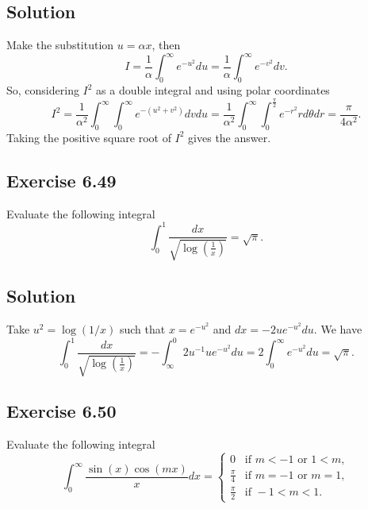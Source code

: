 \subsection*{Solution}

Make the substitution $u = \alpha x$, then
\begin{equation*}
    I = \frac{1}{\alpha} \int_0^{\infty} e^{-u^2} du
        = \frac{1}{\alpha} \int_0^{\infty} e^{-v^2} dv.
\end{equation*}
So, considering $I^2$ as a double integral and using polar coordinates
\begin{equation*}
    I^2 = \frac{1}{\alpha^2} \int_0^{\infty} \int_0^{\infty} e^{-(u^2 + v^2)} dv du
        = \frac{1}{\alpha^2} \int_0^{\infty} \int_0^{\frac{\pi}{2}} e^{-r^2} r d\theta dr
        = \frac{\pi}{4 \alpha^2}.
\end{equation*}
Taking the positive square root of $I^2$ gives the answer.


\subsection*{Exercise 6.49}

Evaluate the following integral
\begin{equation*}
    \int_0^1 \frac{dx}{\sqrt{\log\left(\frac{1}{x}\right)}} = \sqrt{\pi}.
\end{equation*}

\subsection*{Solution}

Take $u^2 = \log(1/x)$ such that $x = e^{-u^2}$ and $dx = -2ue^{-u^2}du$.
We have
\begin{equation*}
    \int_0^1 \frac{dx}{\sqrt{\log\left(\frac{1}{x}\right)}}
        = - \int_{\infty}^0 2 u^{-1} u e^{-u^2} du
        = 2 \int_0^{\infty} e^{-u^2} du
        = \sqrt{\pi}.
\end{equation*}


\subsection*{Exercise 6.50}

Evaluate the following integral
\begin{equation*}
    \int_0^{\infty} \frac{\sin(x) \cos(mx)}{x} dx = \begin{cases}
        0 & \text{if } m < -1 \text{ or } 1 < m, \\
        \frac{\pi}{4} & \text{if } m = -1 \text{ or } m = 1, \\
        \frac{\pi}{2} & \text{if } -1 < m < 1.
    \end{cases}
\end{equation*}


